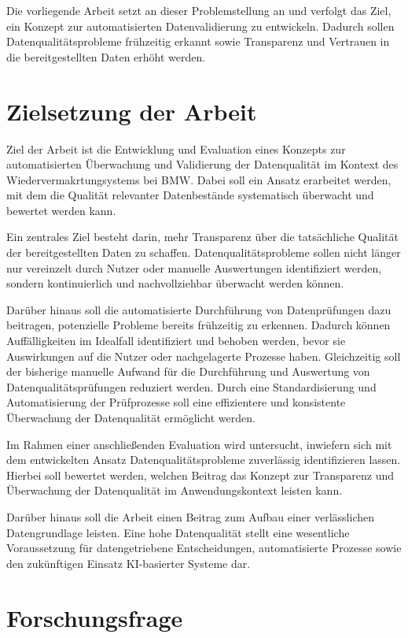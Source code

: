 \documentclass[../main.tex]{subfiles}
\begin{document}
Die vorliegende Arbeit setzt an dieser Problemstellung an und verfolgt das Ziel, ein Konzept zur automatisierten Datenvalidierung zu entwickeln. Dadurch sollen Datenqualitätsprobleme frühzeitig erkannt sowie Transparenz und Vertrauen in die bereitgestellten Daten erhöht werden.

\section{Zielsetzung der Arbeit}

Ziel der Arbeit ist die Entwicklung und Evaluation eines Konzepts zur automatisierten Überwachung und Validierung der Datenqualität im Kontext des Wiedervermakrtungsystems bei BMW. Dabei soll ein Ansatz erarbeitet werden, mit dem die Qualität relevanter Datenbestände systematisch überwacht und bewertet werden kann.

Ein zentrales Ziel besteht darin, mehr Transparenz über die tatsächliche Qualität der bereitgestellten Daten zu schaffen. Datenqualitätsprobleme sollen nicht länger nur vereinzelt durch Nutzer oder manuelle Auswertungen identifiziert werden, sondern kontinuierlich und nachvollziehbar überwacht werden können.

Darüber hinaus soll die automatisierte Durchführung von Datenprüfungen dazu beitragen, potenzielle Probleme bereits frühzeitig zu erkennen. Dadurch können Auffälligkeiten im Idealfall identifiziert und behoben werden, bevor sie Auswirkungen auf die Nutzer oder nachgelagerte Prozesse haben.
Gleichzeitig soll der bisherige manuelle Aufwand für die Durchführung und Auswertung von Datenqualitätsprüfungen reduziert werden. Durch eine Standardisierung und Automatisierung der Prüfprozesse soll eine effizientere und konsistente Überwachung der Datenqualität ermöglicht werden. 

Im Rahmen einer anschließenden Evaluation wird untersucht, inwiefern sich mit dem entwickelten Ansatz Datenqualitätsprobleme zuverlässig identifizieren lassen. Hierbei soll bewertet werden, welchen Beitrag das Konzept zur Transparenz und Überwachung der Datenqualität im Anwendungskontext leisten kann.

Darüber hinaus soll die Arbeit einen Beitrag zum Aufbau einer verlässlichen Datengrundlage leisten. Eine hohe Datenqualität stellt eine wesentliche Voraussetzung für datengetriebene Entscheidungen, automatisierte Prozesse sowie den zukünftigen Einsatz KI-basierter Systeme dar.

\section{Forschungsfrage}
\end{document}
